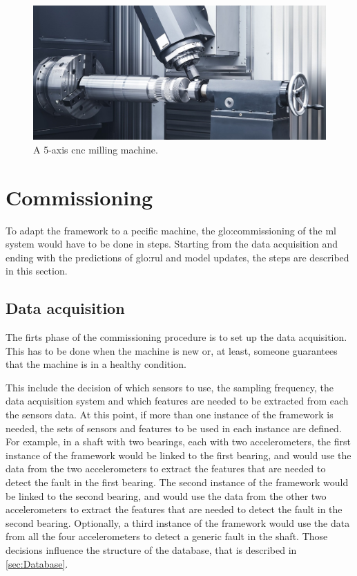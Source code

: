 \begin{figure}
  \centering
  \includegraphics[width=.7\textwidth]{images/Framework/millmachine.jpg}
  \caption{A 5-axis \gls{cnc} milling machine. \cite{FagorAutomation}}
  \label{fig:cnc}
\end{figure}

\section{Commissioning}
To adapt the framework to a pecific machine, the \gls{glo:commissioning} of the \gls{ml} system would have to be done in steps. Starting from the data acquisition and ending with the predictions of \gls{glo:rul} and model updates, the steps are described in this section.

\subsection{Data acquisition}

The firts phase of the commissioning procedure is to set up the data acquisition. This has to be done when the machine is new or, at least, someone guarantees that the machine is in a healthy condition.

This include the decision of which sensors to use, the sampling frequency, the data acquisition system and which features are needed to be extracted from each the sensors data. At this point, if more than one instance of the framework is needed, the sets of sensors and features to be used in each instance are defined. For example, in a shaft with two bearings, each with two accelerometers, the first instance of the framework would be linked to the first bearing, and would use the data from the two accelerometers to extract the features that are needed to detect the fault in the first bearing. The second instance of the framework would be linked to the second bearing, and would use the data from the other two accelerometers to extract the features that are needed to detect the fault in the second bearing. Optionally, a third instance of the framework would use the data from all the four accelerometers to detect a generic fault in the shaft.
Those decisions influence the structure of the database, that is described in \autoref{sec:Database}. 

